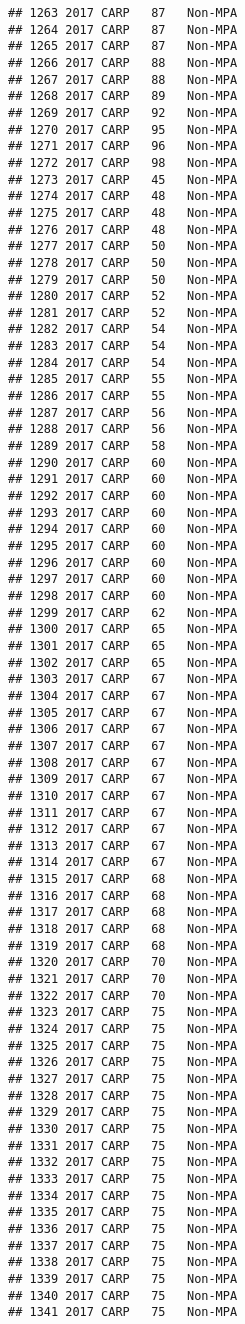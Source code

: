\documentclass[]{article}
\begin{document}
\begin{verbatim}
## 1263 2017 CARP   87   Non-MPA
## 1264 2017 CARP   87   Non-MPA
## 1265 2017 CARP   87   Non-MPA
## 1266 2017 CARP   88   Non-MPA
## 1267 2017 CARP   88   Non-MPA
## 1268 2017 CARP   89   Non-MPA
## 1269 2017 CARP   92   Non-MPA
## 1270 2017 CARP   95   Non-MPA
## 1271 2017 CARP   96   Non-MPA
## 1272 2017 CARP   98   Non-MPA
## 1273 2017 CARP   45   Non-MPA
## 1274 2017 CARP   48   Non-MPA
## 1275 2017 CARP   48   Non-MPA
## 1276 2017 CARP   48   Non-MPA
## 1277 2017 CARP   50   Non-MPA
## 1278 2017 CARP   50   Non-MPA
## 1279 2017 CARP   50   Non-MPA
## 1280 2017 CARP   52   Non-MPA
## 1281 2017 CARP   52   Non-MPA
## 1282 2017 CARP   54   Non-MPA
## 1283 2017 CARP   54   Non-MPA
## 1284 2017 CARP   54   Non-MPA
## 1285 2017 CARP   55   Non-MPA
## 1286 2017 CARP   55   Non-MPA
## 1287 2017 CARP   56   Non-MPA
## 1288 2017 CARP   56   Non-MPA
## 1289 2017 CARP   58   Non-MPA
## 1290 2017 CARP   60   Non-MPA
## 1291 2017 CARP   60   Non-MPA
## 1292 2017 CARP   60   Non-MPA
## 1293 2017 CARP   60   Non-MPA
## 1294 2017 CARP   60   Non-MPA
## 1295 2017 CARP   60   Non-MPA
## 1296 2017 CARP   60   Non-MPA
## 1297 2017 CARP   60   Non-MPA
## 1298 2017 CARP   60   Non-MPA
## 1299 2017 CARP   62   Non-MPA
## 1300 2017 CARP   65   Non-MPA
## 1301 2017 CARP   65   Non-MPA
## 1302 2017 CARP   65   Non-MPA
## 1303 2017 CARP   67   Non-MPA
## 1304 2017 CARP   67   Non-MPA
## 1305 2017 CARP   67   Non-MPA
## 1306 2017 CARP   67   Non-MPA
## 1307 2017 CARP   67   Non-MPA
## 1308 2017 CARP   67   Non-MPA
## 1309 2017 CARP   67   Non-MPA
## 1310 2017 CARP   67   Non-MPA
## 1311 2017 CARP   67   Non-MPA
## 1312 2017 CARP   67   Non-MPA
## 1313 2017 CARP   67   Non-MPA
## 1314 2017 CARP   67   Non-MPA
## 1315 2017 CARP   68   Non-MPA
## 1316 2017 CARP   68   Non-MPA
## 1317 2017 CARP   68   Non-MPA
## 1318 2017 CARP   68   Non-MPA
## 1319 2017 CARP   68   Non-MPA
## 1320 2017 CARP   70   Non-MPA
## 1321 2017 CARP   70   Non-MPA
## 1322 2017 CARP   70   Non-MPA
## 1323 2017 CARP   75   Non-MPA
## 1324 2017 CARP   75   Non-MPA
## 1325 2017 CARP   75   Non-MPA
## 1326 2017 CARP   75   Non-MPA
## 1327 2017 CARP   75   Non-MPA
## 1328 2017 CARP   75   Non-MPA
## 1329 2017 CARP   75   Non-MPA
## 1330 2017 CARP   75   Non-MPA
## 1331 2017 CARP   75   Non-MPA
## 1332 2017 CARP   75   Non-MPA
## 1333 2017 CARP   75   Non-MPA
## 1334 2017 CARP   75   Non-MPA
## 1335 2017 CARP   75   Non-MPA
## 1336 2017 CARP   75   Non-MPA
## 1337 2017 CARP   75   Non-MPA
## 1338 2017 CARP   75   Non-MPA
## 1339 2017 CARP   75   Non-MPA
## 1340 2017 CARP   75   Non-MPA
## 1341 2017 CARP   75   Non-MPA

\end{verbatim}
\end{document}
